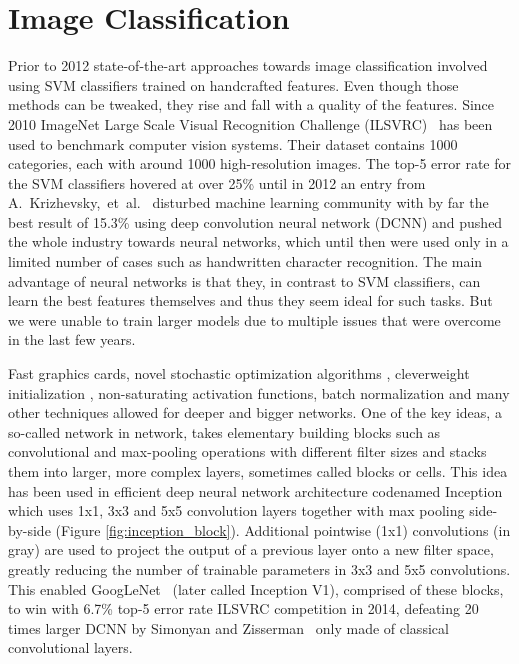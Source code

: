 \section{Image Classification}
Prior to 2012 state-of-the-art approaches towards image classification involved using SVM classifiers trained on handcrafted features. Even though those methods can be tweaked, they rise and fall with a quality of the features. Since 2010 ImageNet Large Scale Visual Recognition Challenge (ILSVRC)~\cite{ILSVRC15} has been used to benchmark computer vision systems. Their dataset contains 1000 categories, each with around 1000 high-resolution images. The top-5 error rate for the SVM classifiers hovered at over 25\% until in 2012 an entry from A.~Krizhevsky,~et~al.~\cite{AlexNet} disturbed machine learning community with by far the best result of 15.3\% using deep convolution neural network (DCNN) and pushed the whole industry towards neural networks, which until then were used only in a limited number of cases such as handwritten character recognition. The main advantage of neural networks is that they, in contrast to SVM classifiers, can learn the best features themselves and thus they seem ideal for such tasks. But we were unable to train larger models due to multiple issues that were overcome in the last few years.

Fast graphics cards, novel stochastic optimization algorithms \cite{kingma2014adam}, clever\linebreak[5] weight initialization \cite{glorot2010understanding}, non-saturating activation functions, batch normalization \cite{ioffe2015batch} and many other techniques allowed for deeper and bigger networks. One of the key ideas, a so-called network in network, takes elementary building blocks such as convolutional and max-pooling operations with different filter sizes and stacks them into larger, more complex layers, sometimes called blocks or cells. This idea has been used in efficient deep neural network architecture codenamed Inception~\cite{szegedy2015going} which uses 1x1, 3x3 and 5x5 convolution layers together with max pooling side-by-side (Figure \ref{fig:inception_block}). Additional pointwise (1x1) convolutions (in gray) are used to project the output of a previous layer onto a new filter space, greatly reducing the number of trainable parameters in 3x3 and 5x5 convolutions. This enabled GoogLeNet~\cite{szegedy2015going} (later called Inception V1), comprised of these blocks, to win with 6.7\% top-5 error rate ILSVRC competition in 2014, defeating 20 times larger DCNN by Simonyan and Zisserman~\cite{simonyan2014very} only made of classical convolutional layers.

